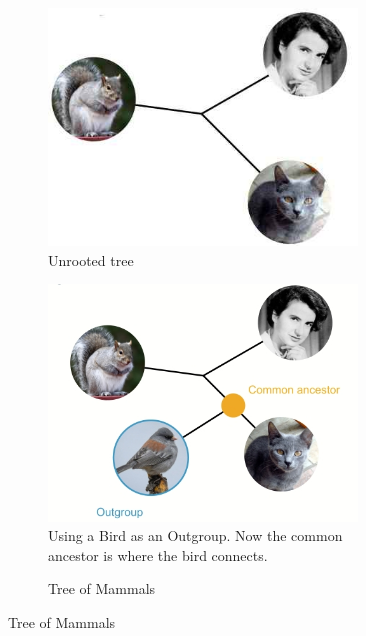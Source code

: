 \documentclass[]{article}
\begin{document}
\begin{figure}[H]
	\caption{Adding an Outgroup to the Tree of Mammals}
	\begin{subfigure}[t]{0.3\textwidth}
		\caption{Unrooted tree}\label{fig:bird:without:outgroup}
		\includegraphics[width=0.9\textwidth]{WithoutOutgroup}
	\end{subfigure}
	\begin{subfigure}[t]{0.3\textwidth}
		\caption{Using a Bird as an Outgroup. Now the common ancestor is where the bird connects.}\label{fig:bird:outgroup}
		\includegraphics[width=0.9\textwidth]{Outgroup}
	\end{subfigure}
	\begin{subfigure}[t]{0.3\textwidth}
		\caption{Tree of Mammals}\label{fig:bird-mammals}

\end{subfigure}
\end{figure}
\end{document}
